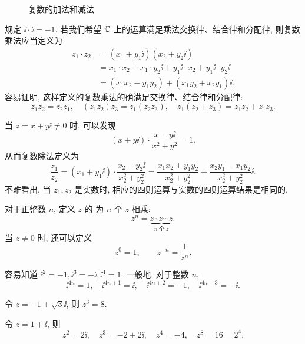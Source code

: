 \begin{figure}[!htb]
  \centering
  \caption{复数的加法和减法}
\end{figure}

\alert{规定 $\ii\cdot \ii=-1$}.
若我们希望 ${\mathbb{C}}$ 上的运算满足乘法交换律、结合律和分配律, 则复数乘法应当定义为
\begin{align*}
   z_1\cdot z_2&
  =(x_1+y_1\ii)(x_2+y_2\ii)\\&
  =x_1\cdot x_2+x_1\cdot y_2\ii+y_1\ii\cdot x_2+y_1\ii\cdot y_2\ii\\&
  =(x_1x_2-y_1y_2)+(x_1y_2+x_2y_1)\ii.
\end{align*}
容易证明, 这样定义的复数乘法的确满足交换律、结合律和分配律:
\[
  z_1z_2=z_2z_1,\quad
  (z_1z_2) z_3=z_1(z_2 z_3),\quad
  z_1(z_2+z_3)=z_1z_2+z_1z_3.
\]

当 $z=x+y\ii\neq0$ 时, 可以发现
\[
  (x+y\ii)\cdot\frac{x-y\ii}{x^2+y^2}=1.
\]
从而复数除法定义为
\[
   \frac{z_1}{z_2}
  =(x_1+y_1\ii)\cdot\frac{x_2-y_2\ii}{x_2^2+y_2^2}
  =\frac{x_1x_2+y_1y_2}{x_2^2+y_2^2}+\frac{x_2y_1-x_1y_2}{x_2^2+y_2^2}\ii.
\]
不难看出, 当 $z_1,z_2$ 是实数时, 相应的四则运算与实数的四则运算结果是相同的.

对于正整数 $n$, 定义 $z$ 的 为 $n$ 个 $z$ 相乘:
\[
  z^n=\underbrace{z\cdot z\cdots z}_{n\ \text{个}\ z}.
\]
当 $z\neq 0$ 时, 还可以定义
\[
  z^0=1,\qquad
  z^{-n}=\frac1{z^n}.
\]

\begin{exampleenum}
  \item 容易知道 $\ii^2=-1,\ii^3=-\ii,\ii^4=1$.
  一般地, 对于整数 $n$, 
  \[
    \ii^{4n}=1,\quad 
    \ii^{4n+1}=\ii,\quad 
    \ii^{4n+2}=-1,\quad 
    \ii^{4n+3}=-\ii.
  \]
  \item 令 $z=-1+\sqrt 3\ii$, 则 $z^3=8$.
  \item 令 $z=1+\ii$, 则
  \[
    z^2=2\ii,\quad 
    z^3=-2+2\ii,\quad 
    z^4=-4,\quad 
    z^8=16=2^4.
  \]
\end{exampleenum}

